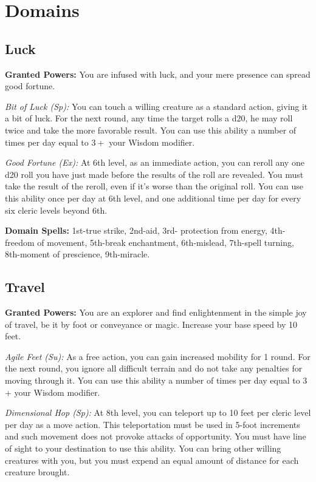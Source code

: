 \documentclass{spelllist}
\begin{document}
  \section*{Domains}
  \subsection*{Luck}
  \textbf{Granted Powers:} You are infused with luck, and your
mere presence can spread good fortune.

  \emph{Bit of Luck (Sp):} You can touch a willing creature as a
  standard action, giving it a bit of luck. For the next round,
  any time the target rolls a d20, he may roll twice and take
  the more favorable result. You can use this ability a number
  of times per day equal to $3 +$ your Wisdom modifier.
  
  \emph{Good Fortune (Ex):} At 6th level, as an immediate action,
  you can reroll any one d20 roll you have just made before
  the results of the roll are revealed. You must take the result
  of the reroll, even if it’s worse than the original roll. You can
  use this ability once per day at 6th level, and one additional
  time per day for every six cleric levels beyond 6th.
  
  \textbf{Domain Spells:} 1st-true strike, 2nd-aid, 3rd-
  protection from energy, 4th-freedom of movement, 5th-break
  enchantment, 6th-mislead, 7th-spell turning, 8th-moment
  of prescience, 9th-miracle.
  
  \subsection*{Travel}
  \textbf{Granted Powers:} You are an explorer and find
  enlightenment in the simple joy of travel, be it by foot or
  conveyance or magic. Increase your base speed by 10 feet.
  
  \emph{Agile Feet (Su):} As a free action, you can gain increased
  mobility for 1 round. For the next round, you ignore all
  difficult terrain and do not take any penalties for moving
  through it. You can use this ability a number of times per
  day equal to 3 + your Wisdom modifier.
  
  \emph{Dimensional Hop (Sp):} At 8th level, you can teleport up
  to 10 feet per cleric level per day as a move action. This
  teleportation must be used in 5-foot increments and such
  movement does not provoke attacks of opportunity. You
  must have line of sight to your destination to use this
  ability. You can bring other willing creatures with you,
  but you must expend an equal amount of distance for each
  creature brought.
  
\end{document}
